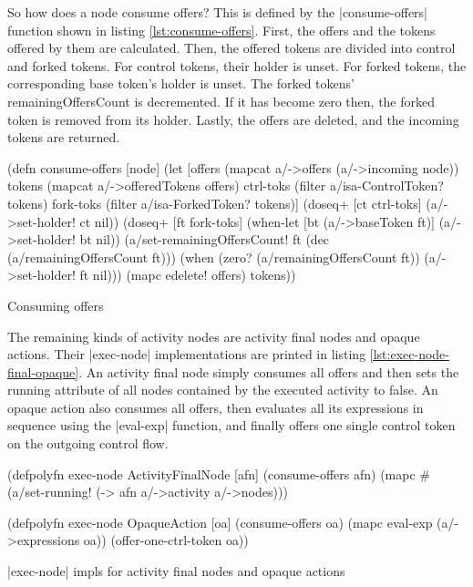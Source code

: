 \documentclass[submission]{eptcs}
\newcommand{\code}{\clojureinline}
\begin{document}
So how does a node consume offers?  This is defined by the
\code|consume-offers| function shown in listing \vref{lst:consume-offers}.
First, the offers and the tokens offered by them are calculated.  Then, the
offered tokens are divided into control and forked tokens.  For control tokens,
their holder is unset.  For forked tokens, the corresponding base token's
holder is unset.  The forked tokens' \textsf{remainingOffersCount} is
decremented.  If it has become zero then, the forked token is removed from its
holder.  Lastly, the offers are deleted, and the incoming tokens are returned.

\begin{listing}[h!tb]
\begin{clojurecode}
(defn consume-offers [node]
  (let [offers    (mapcat a/->offers (a/->incoming node))
        tokens    (mapcat a/->offeredTokens offers)
        ctrl-toks (filter a/isa-ControlToken? tokens)
        fork-toks (filter a/isa-ForkedToken? tokens)]
    (doseq+ [ct ctrl-toks]
      (a/->set-holder! ct nil))
    (doseq+ [ft fork-toks]
      (when-let [bt (a/->baseToken ft)]
        (a/->set-holder! bt nil))
      (a/set-remainingOffersCount! ft (dec (a/remainingOffersCount ft)))
      (when (zero? (a/remainingOffersCount ft))
        (a/->set-holder! ft nil)))
    (mapc edelete! offers)
    tokens))
\end{clojurecode}
\caption{Consuming offers}
\label{lst:consume-offers}
\end{listing}

The remaining kinds of activity nodes are activity final nodes and opaque
actions.  Their \code|exec-node| implementations are printed in listing
\vref{lst:exec-node-final-opaque}.  An activity final node simply consumes all
offers and then sets the \textsf{running} attribute of all nodes contained by
the executed activity to false.  An opaque action also consumes all offers,
then evaluates all its expressions in sequence using the \code|eval-exp|
function, and finally offers one single control token on the outgoing control
flow.

\begin{listing}[h!tb]
\begin{clojurecode}
(defpolyfn exec-node ActivityFinalNode [afn]
  (consume-offers afn)
  (mapc #(a/set-running! %
        (-> afn a/->activity a/->nodes)))

(defpolyfn exec-node OpaqueAction [oa]
  (consume-offers oa)
  (mapc eval-exp (a/->expressions oa))
  (offer-one-ctrl-token oa))
\end{clojurecode}
\caption{\code|exec-node| impls for activity final nodes and opaque actions}
\label{lst:exec-node-final-opaque}
\end{listing}
\end{document}
